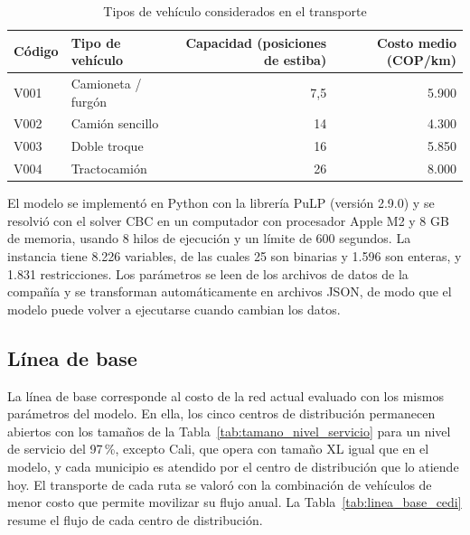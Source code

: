 \documentclass[fleqn, 11pt,letterpaper]{article}
\begin{document}
\begin{table}[H]
\centering
\caption{Tipos de vehículo considerados en el transporte}
\label{tab:vehiculos}
\begin{tabular}{llrr}
\toprule
\textbf{Código} & \textbf{Tipo de vehículo} & \textbf{Capacidad (posiciones de estiba)} & \textbf{Costo medio (COP/km)} \\
\midrule
V001 & Camioneta / furgón & 7,5 & 5.900 \\
V002 & Camión sencillo    & 14  & 4.300 \\
V003 & Doble troque       & 16  & 5.850 \\
V004 & Tractocamión       & 26  & 8.000 \\
\bottomrule
\end{tabular}
\end{table}

El modelo se implementó en Python con la librería PuLP (versión 2.9.0) y se resolvió con el solver CBC en un computador con procesador Apple M2 y 8 GB de memoria, usando 8 hilos de ejecución y un límite de 600 segundos. La instancia tiene 8.226 variables, de las cuales 25 son binarias y 1.596 son enteras, y 1.831 restricciones. Los parámetros se leen de los archivos de datos de la compañía y se transforman automáticamente en archivos JSON, de modo que el modelo puede volver a ejecutarse cuando cambian los datos.

\subsection{Línea de base}
La línea de base corresponde al costo de la red actual evaluado con los mismos parámetros del modelo. En ella, los cinco centros de distribución permanecen abiertos con los tamaños de la Tabla~\ref{tab:tamano_nivel_servicio} para un nivel de servicio del 97\,\%, excepto Cali, que opera con tamaño XL igual que en el modelo, y cada municipio es atendido por el centro de distribución que lo atiende hoy. El transporte de cada ruta se valoró con la combinación de vehículos de menor costo que permite movilizar su flujo anual. La Tabla~\ref{tab:linea_base_cedi} resume el flujo de cada centro de distribución.
\end{document}
